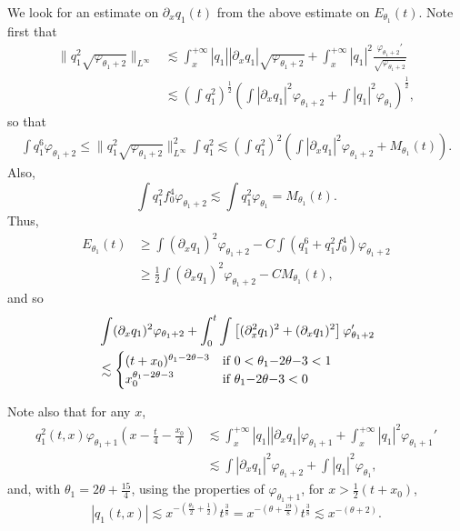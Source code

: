 \documentclass[11pt,a4paper,reqno]{amsart}
\theoremstyle{remark}
\numberwithin{equation}{section}
\newcommand{\be}{\begin{equation}}
\newcommand{\ee}{\end{equation}}
\begin{document}
We look for an estimate on $\partial_x q_1(t)$ from the above estimate on $E_{\theta_1}(t)$.
Note first that
\begin{align}
\|q_1^2 \sqrt{\varphi_{\theta_1+2}} \|_{L^\infty} &\lesssim
\int_x^{+\infty} |q_1| |\partial_x q_1| \sqrt{\varphi_{\theta_1+2}}
+ \int_x^{+\infty} |q_1|^2 \frac {\varphi_{\theta_1+2}'}{\sqrt{\varphi_{\theta_1+2}}}\nonumber\\
& \lesssim \left( \int q_1^2\right)^{\frac 12} \left( \int |\partial_x q_1|^2  \varphi_{\theta_1+2}
+ \int |q_1|^2 \varphi_{\theta_1}\right)^{\frac 12},\label{Linfty}
\end{align}
so that
\begin{align*}
\int q_1^6 \varphi_{\theta_1+2} \leq \|q_1^2 \sqrt{\varphi_{\theta_1+2}} \|_{L^\infty}^2
\int q_1^2 \lesssim 
\left( \int q_1^2\right)^2 \left( \int |\partial_x q_1|^2  \varphi_{\theta_1+2}
+ M_{\theta_1}(t)\right) .
\end{align*}
Also,
$$
\int q_1^2 f_0^4 \varphi_{\theta_1+2} \lesssim \int q_1^2 \varphi_{\theta_1} = M_{\theta_1}(t).
$$
Thus,
\begin{align}
E_{\theta_1}(t) & \geq \int (\partial_x q_1)^2 \varphi_{\theta_1+2} - C \int (q_1^6 + q_1^2 f_0^4) \varphi_{\theta_1+2}\nonumber\\
& \geq \frac 12 \int (\partial_x q_1)^2 \varphi_{\theta_1+2} - C M_{\theta_1}(t),\label{eq6}
\end{align}
and so
\begin{align}
&\int (\partial_x q_1)^2 \varphi_{\theta_1+2}+ \int_0^t \int \left[(\partial_x^2 q_1)^2 + (\partial_x q_1)^2 \right]\varphi_{\theta_1+2}'\nonumber \\
&\lesssim \begin{cases} (t+x_0)^{ \theta_1 -2 \theta-3 } & \hbox{if $0<\theta_1 {-}2 \theta{-}3<1$}   \\
  x_0^{ \theta_1 -2 \theta-3 } & \hbox{if $\theta_1 {-}2 \theta{-}3<0$} \end{cases} \label{eqEbb}\end{align}
 
Note also that for  any $x$,
\begin{align}
  q_1^2(t,x) \varphi_{\theta_1+1}\left( x - \frac t4-\frac {x_0} 4\right) 
& \lesssim \int_x^{+\infty}  |q_1| |\partial_x q_1|  \varphi_{\theta_1+1} 
+\int_x^{+\infty} |q_1|^2 \varphi_{\theta_1+1}' \nonumber \\
& \lesssim 
\int    |\partial_x q_1|^2  \varphi_{\theta_1+2} 
+\int  |q_1|^2 \varphi_{\theta_1} ,
\label{linfty}\end{align}
and, with $\theta_1 = 2 \theta+ \frac {15}4$,
using the properties of $\varphi_{\theta_1+1}$, for $x>\frac 12 (t+x_0)$, 
\be\label{A11}
|q_1(t,x)| \lesssim x^{- (\frac {\theta_1}2 +\frac 12 )} t^{\frac 38} =x^{- (\theta+\frac {19}8)} t^{\frac 38}
  \lesssim   x^{- (\theta+2)}.
\ee
\end{document}
